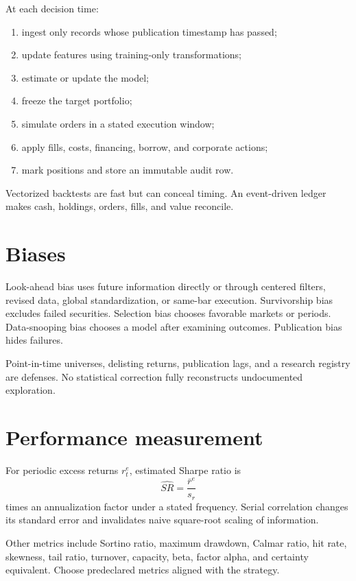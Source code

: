 At each decision time:

\begin{enumerate}
\item ingest only records whose publication timestamp has passed;
\item update features using training-only transformations;
\item estimate or update the model;
\item freeze the target portfolio;
\item simulate orders in a stated execution window;
\item apply fills, costs, financing, borrow, and corporate actions;
\item mark positions and store an immutable audit row.
\end{enumerate}

Vectorized backtests are fast but can conceal timing. An event-driven ledger makes
cash, holdings, orders, fills, and value reconcile.

\section{Biases}

Look-ahead bias uses future information directly or through centered filters, revised
data, global standardization, or same-bar execution. Survivorship bias excludes
failed securities. Selection bias chooses favorable markets or periods. Data-snooping
bias chooses a model after examining outcomes. Publication bias hides failures.

Point-in-time universes, delisting returns, publication lags, and a research registry
are defenses. No statistical correction fully reconstructs undocumented exploration.

\section{Performance measurement}

For periodic excess returns $r_t^e$, estimated Sharpe ratio is
\[
\widehat{SR}=\frac{\bar r^e}{s_r}
\]
times an annualization factor under a stated frequency. Serial correlation changes
its standard error and invalidates naive square-root scaling of information.

Other metrics include Sortino ratio, maximum drawdown, Calmar ratio, hit rate,
skewness, tail ratio, turnover, capacity, beta, factor alpha, and certainty equivalent.
Choose predeclared metrics aligned with the strategy.

